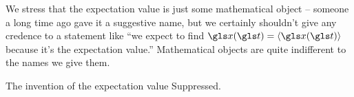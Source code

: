 We stress that the expectation value is just some mathematical
object -- someone a long time ago gave it a suggestive 
name, but we certainly shouldn't 
give any credence to a statement like ``we expect to find $\x(\t)=\ave{\x(\t)}$ 
because it's the expectation value.'' Mathematical objects
are quite indifferent to the names we give them.

\begin{history}{The invention of the expectation value}
Suppressed.
\end{history}

